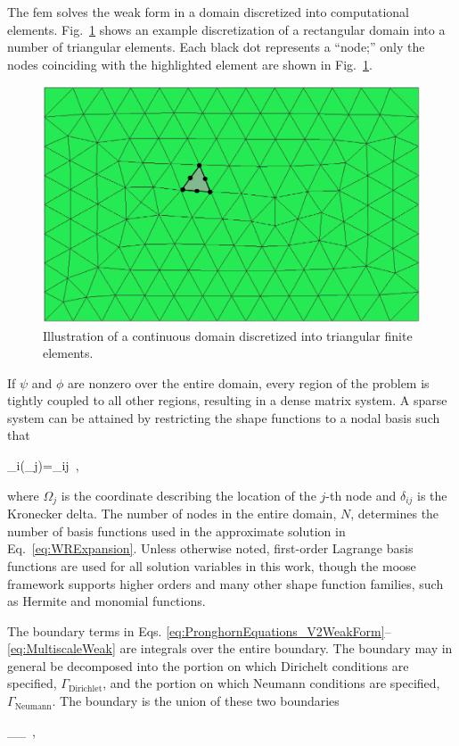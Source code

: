 The \gls{fem} solves the weak form in a domain discretized into computational elements. Fig.\ \ref{fig:fe_mesh} shows an example discretization of a rectangular domain into a number of triangular elements. Each black dot represents a ``node;'' only the nodes coinciding with the highlighted element are shown in Fig.\ \ref{fig:fe_mesh}.

\begin{figure}[!h]
\centering
\includegraphics[width=0.45\linewidth]{figs/fe_mesh.png}
\caption{Illustration of a continuous domain discretized into triangular finite elements.}
\label{fig:fe_mesh}
\end{figure}

If \(\psi\) and \(\phi\) are nonzero over the entire domain, every region of the problem is tightly coupled to all other regions, resulting in a dense matrix system. A sparse system can be attained by restricting the shape functions to a nodal basis such that

\beq
\label{eq:Nodal}
\phi_i(\Omega_j)=\delta_{ij}\ ,
\eeq

\noindent where \(\Omega_j\) is the coordinate describing the location of the \(j\)-th node and \(\delta_{ij}\) is the Kronecker delta. The number of nodes in the entire domain, \(N\), determines the number of basis functions used in the approximate solution in Eq.\ \eqref{eq:WRExpansion}. Unless otherwise noted, first-order Lagrange basis functions are used for all solution variables in this work, though the \gls{moose} framework supports higher orders and many other shape function families, such as Hermite and monomial functions.

The boundary terms in Eqs. \eqref{eq:PronghornEquations_V2WeakForm}--\eqref{eq:MultiscaleWeak} are integrals over the entire boundary. The boundary may in general be decomposed into the portion on which Dirichelt conditions are specified, \(\Gamma_\text{Dirichlet}\), and the portion on which Neumann conditions are specified, \(\Gamma_\text{Neumann}\). The boundary is the union of these two boundaries

\beq
\Gamma\equiv\Gamma_\cup\Gamma_\ ,
\eeq

